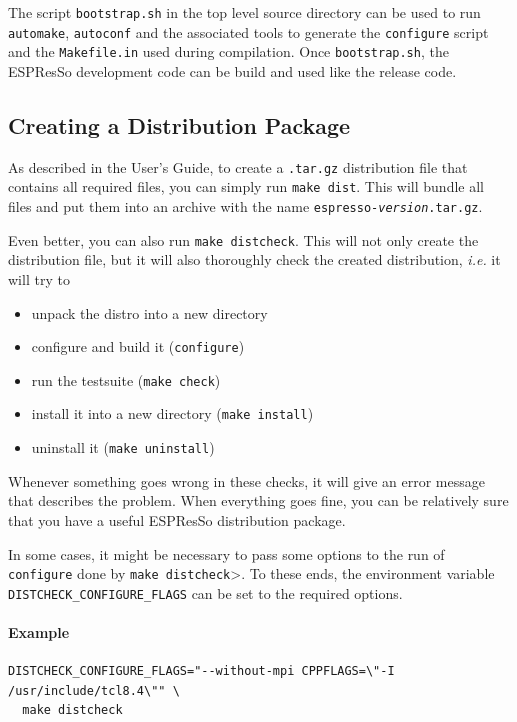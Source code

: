 \documentclass[
a4paper,                        %
11pt,                           %
twoside,                        %
footsepline,                    %
headsepline,                    %
headexclude,                    %
footexclude,                    %
pagesize,                       %
bibtotocnumbered,               %
idxtotoc                        %
]{scrreprt}
\newcommand{\es}{\mbox{\textsf{ESPResSo}}\xspace}
\newcommand{\ie}{\textit{i.e.}\xspace}
\begin{document}
The script \texttt{bootstrap.sh} in the top level source directory can
be used to run \texttt{automake}, \texttt{autoconf} and the associated
tools to generate the \texttt{configure} script and the
\texttt{Makefile.in} used during compilation.  Once
\texttt{bootstrap.sh}, the \es development code can be build and used
like the release code.

\subsection{Creating a Distribution Package}

As described in the User's Guide, to create a \texttt{.tar.gz}
distribution file that contains all required files, you can simply run
\texttt{make dist}. This will bundle all files and put them into an
archive with the name
\texttt{espresso-\textit{version}\texttt{.tar.gz}}.

Even better, you can also run \texttt{make distcheck}. This will not
only create the distribution file, but it will also thoroughly check
the created distribution, \ie it will try to 
\begin{itemize}
\item unpack the distro into a new directory
\item configure and build it (\texttt{configure})
\item run the testsuite (\texttt{make check})
\item install it into a new directory (\texttt{make install})
\item uninstall it (\texttt{make uninstall})
\end{itemize}
Whenever something goes wrong in these checks, it will give an error
message that describes the problem. When everything goes fine, you can
be relatively sure that you have a useful \es distribution
package.

In some cases, it might be necessary to pass some options to the run
of \texttt{configure} done by \texttt{make distcheck}>. To these ends,
the environment variable \texttt{DISTCHECK\_CONFIGURE\_FLAGS} can be
set to the required options.

\paragraph{Example}
\begin{verbatim}
DISTCHECK_CONFIGURE_FLAGS="--without-mpi CPPFLAGS=\"-I /usr/include/tcl8.4\"" \
  make distcheck
\end{verbatim}
\end{document}
